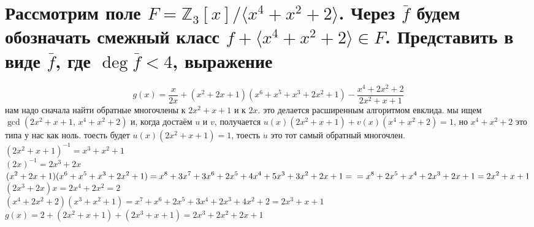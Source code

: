 \documentclass{article}
\newcommand{\ds}{\displaystyle}
\newcommand{\Z}{\mathbb{Z}}
\renewcommand{\f}{\frac}
\begin{document}
  \section{Рассмотрим поле $F = \Z_3[x]/\langle x^4+x^2+2 \rangle $. Через $\bar{f}$ будем обозначать смежный класс $f+\langle x^4+x^2+2 \rangle\in F$. Представить в виде $\bar{f}$, где $\deg \bar{f} < 4$, выражение}
  $$ g(x) = \f{x}{2x} + (x^2+2x+1)(x^6+x^5+x^3+2x^2+1) - \f{x^4+2x^2+2}{2x^2+x+1} $$
  нам надо сначала найти обратные многочлены к $2x^2+x+1$ и к $2x$.
  это делается расширенным алгоритмом евклида.
  мы ищем $\gcd(2x^2+x+1,\, x^4+x^2+2)$ и, когда достаём $u$ и $v$, получается $u(x)(2x^2+x+1) + v(x)(x^4+x^2+2) = 1$,
  но $x^4+x^2+2$ это типа у нас как ноль. тоесть будет $u(x)(2x^2+x+1) = 1$, тоесть $u$ это тот самый обратный многочлен. \\
  $\ds (2x^2+x+1)^{-1} = x^3 + x^2 + 1$ \\
  $\ds (2x)^{-1} = 2 x^3 + 2 x$ \\
  $\ds (x^2+2x+1)(x^6+x^5+x^3+2x^2+1) = x^8 + 3 x^7 + 3 x^6 + 2 x^5 + 4 x^4 + 5 x^3 + 3 x^2 + 2 x + 1
  =\\= x^8 + 2 x^5 + x^4 + 2 x^3 + 2 x + 1 = 2 x^2 + x + 1 $ \\
  $\ds (2 x^3 + 2 x)x = 2 x^4 + 2 x^2 = 2 $ \\
  $\ds (x^4+2x^2+2)(x^3 + x^2 + 1) = x^7 + x^6 + 2 x^5 + 3 x^4 + 2 x^3 + 4 x^2 + 2 = 2 x^3 + x + 1 $ \\
  $\ds g(x) = 2 + (2 x^2 + x + 1) + (2 x^3 + x + 1) = 2 x^3 + 2 x^2 + 2 x + 1 $
\end{document}
